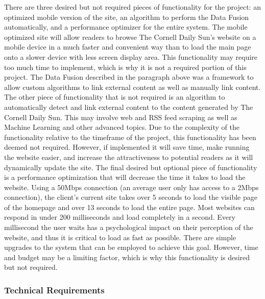 \documentclass[11pt]{article} %
\begin{document}
There are three desired but not required pieces of functionality for the project: an optimized mobile version of the site, an algorithm to perform the Data Fusion automatically, and a performance optimizer for the entire system. The mobile optimized site will allow readers to browse The Cornell Daily Sun’s website on a mobile device in a much faster and convenient way than to load the main page onto a slower device with less screen display area. This functionality may require too much time to implement, which is why it is not a required portion of this project. The Data Fusion described in the paragraph above was a framework to allow custom algorithms to link external content as well as manually link content. The other piece of functionality that is not required is an algorithm to automatically detect and link external content to the content generated by The Cornell Daily Sun. This may involve web and RSS feed scraping as well as Machine Learning and other advanced topics. Due to the complexity of the functionality relative to the timeframe of the project, this functionality has been deemed not required. However, if implemented it will save time, make running the website easier, and increase the attractiveness to potential readers as it will dynamically update the site. The final desired but optional piece of functionality is a performance optimization that will decrease the time it takes to load the website. Using a 50Mbps connection (an average user only has access to a 2Mbps connection), the client’s current site takes over 5 seconds to load the visible page of the homepage and over 13 seconds to load the entire page. Most websites can respond in under 200 milliseconds and load completely in a second. Every millisecond the user waits has a psychological impact on their perception of the website, and thus it is critical to load as fast as possible. There are simple upgrades to the system that can be employed to achieve this goal. However, time and budget may be a limiting factor, which is why this functionality is desired but not required.

\subsubsection{Technical Requirements}
\end{document}
